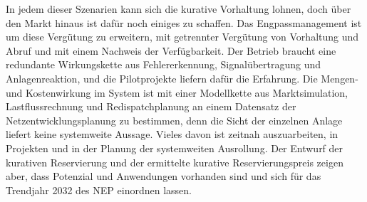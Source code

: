 In jedem dieser Szenarien kann sich die kurative Vorhaltung lohnen, doch über den Markt hinaus ist dafür noch einiges zu schaffen.
Das Engpassmanagement ist um diese Vergütung zu erweitern, mit getrennter Vergütung von Vorhaltung und Abruf und mit einem Nachweis der Verfügbarkeit.
Der Betrieb braucht eine redundante Wirkungskette aus Fehlererkennung, Signalübertragung und Anlagenreaktion, und die Pilotprojekte liefern dafür die Erfahrung.
Die Mengen- und Kostenwirkung im System ist mit einer Modellkette aus Marktsimulation, Lastflussrechnung und Redispatchplanung an einem Datensatz der Netzentwicklungsplanung zu bestimmen, denn die Sicht der einzelnen Anlage liefert keine systemweite Aussage.
Vieles davon ist zeitnah auszuarbeiten, in Projekten und in der Planung der systemweiten Ausrollung.
Der Entwurf der kurativen Reservierung und der ermittelte kurative Reservierungspreis zeigen aber, dass Potenzial und Anwendungen vorhanden sind und sich für das Trendjahr 2032 des \ac{NEP} einordnen lassen.
